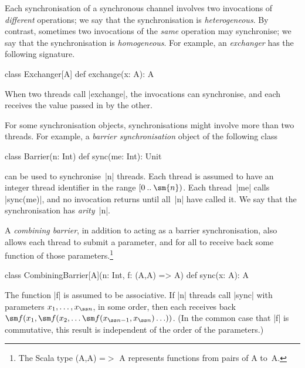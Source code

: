 Each synchronisation of a synchronous channel involves two invocations of
\emph{different} operations; we say that the synchronisation is
\emph{heterogeneous}.  By contrast, sometimes two invocations of the
\emph{same} operation may synchronise; we say that the synchronisation is
\emph{homogeneous}.  For example, an \emph{exchanger} has the following
signature.
%
\begin{scala}
class Exchanger[A]{
  def exchange(x: A): A
}
\end{scala}
%
When two threads call |exchange|, the invocations can synchronise, and each
receives the value passed in by the other.

For some synchronisation objects, synchronisations might involve more than two
threads.  For example, a \emph{barrier synchronisation} object of the
following class
%
\begin{scala}
class Barrier(n: Int){
  def sync(me: Int): Unit
}
\end{scala}
%
can be used to synchronise~|n| threads.  Each thread is assumed to have an
integer thread identifier in the range $\range{0}{\sm{n}}$.  Each thread~|me|
calls |sync(me)|, and no invocation returns until all~|n| have called it.  We
say that the synchronisation has \emph{arity}~|n|.

A \emph{combining barrier}, in addition to acting as a barrier
synchronisation, also allows each thread to submit a parameter, and for all to
receive back some function of those parameters.\footnote{The Scala type
  {\scalastyle (A,A) =}$>$ {\scalastyle A} represents functions from pairs of
  {\scalastyle A} to~{\scalastyle A}.}
%
\begin{scala}
class CombiningBarrier[A](n: Int, f: (A,A) => A){
  def sync(x: A): A
}
\end{scala}
%
The function |f| is assumed to be associative.  If |n| threads call |sync|
with parameters $x_1, \ldots, x_{\ss n}$, in some order, then each receives
back $\sm f(x_1, \sm f(x_2, \ldots \sm f(x_{{\ss n}-1}, x_{\ss n}) \ldots ))$.
(In the common case that |f| is commutative, this result is independent of the
order of the parameters.)

